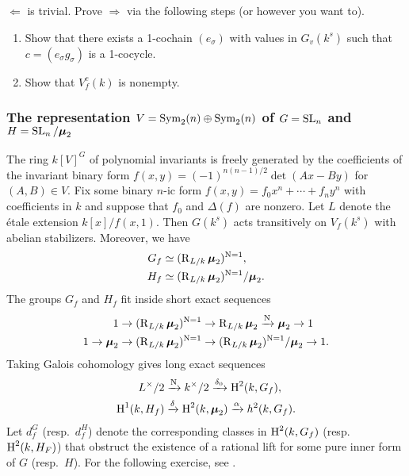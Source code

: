 \begin{exercise}
$\Leftarrow$ is trivial. Prove $\Rightarrow$ via the following steps (or 
however you want to). 
\begin{enumerate}
  \item Show that there exists a 1-cochain $(e_\sigma)$ with values in 
    $G_v(k^s)$ such that $c=(e_\sigma g_\sigma)$ is a 1-cocycle. 
  \item Show that $V_f^c(k)$ is nonempty. 
\end{enumerate}
\end{exercise}


\subsubsection{The representation $V=\operatorname{Sym}_2(n)\oplus \operatorname{Sym}_2(n)$ of $G=\operatorname{SL}_n$ and $H=\operatorname{SL}_n/\boldsymbol\mu_2$}

The ring $k[V]^G$ of polynomial invariants is freely generated by the 
coefficients of the invariant binary form $f(x,y)=(-1)^{n(n-1)/2}\det(A x-B y)$ 
for $(A,B)\in V$. Fix some binary $n$-ic form 
$f(x,y) = f_0 x^n + \cdots + f_n y^n$ with coefficients in $k$ and suppose that 
$f_0$ and $\Delta(f)$ are nonzero. Let $L$ denote the \'etale extension 
$k[x]/f(x,1)$. Then $G(k^s)$ acts transitively on $V_f(k^s)$ with abelian 
stabilizers. Moreover, we have 
\begin{align*}
  G_f &\simeq (\operatorname{R}_{L/k}\boldsymbol\mu_2)^{\operatorname{N}=1} , \\
  H_f &\simeq (\operatorname{R}_{L/k}\boldsymbol\mu_2)^{\operatorname{N}=1}/\boldsymbol\mu_2 .
\end{align*}
The groups $G_f$ and $H_f$ fit inside short exact sequences 
\begin{align*}
  1 \to (\operatorname{R}_{L/k}\boldsymbol\mu_2)^{\operatorname{N}=1} &\to \operatorname{R}_{L/k}\boldsymbol\mu_2 \xrightarrow{\operatorname{N}} \boldsymbol\mu_2 \to 1 \\
  1 \to \boldsymbol\mu_2 \to (\operatorname{R}_{L/k}\boldsymbol\mu_2)^{\operatorname{N}=1} &\to (\operatorname{R}_{L/k}\boldsymbol\mu_2)^{\operatorname{N}=1}/\boldsymbol\mu_2 \to 1 .
\end{align*}
Taking Galois cohomology gives long exact sequences 
\begin{align*}
  L^\times / 2 &\xrightarrow{\operatorname{N}} k^\times / 2 \xrightarrow{\delta_0} \operatorname{H}^2(k,G_f) , \\
  \operatorname{H}^1(k,H_f) &\xrightarrow{\delta} \operatorname{H}^2(k,\boldsymbol\mu_2) \xrightarrow\alpha h^2(k,G_f) .
\end{align*}
Let $d_f^G$ (resp.~$d_f^H$) denote the corresponding classes in $\operatorname{H}^2(k,G_f)$ 
(resp.~$\operatorname{H}^2(k,H_F)$) that obstruct the existence of a rational lift for some 
pure inner form of $G$ (resp.~$H$). For the following exercise, see 
\cite[\S 4.5]{bgw13}. 

